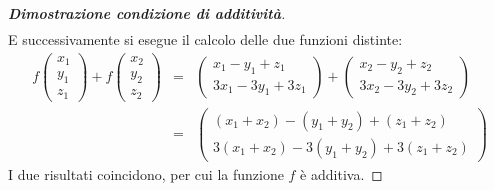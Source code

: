 \documentclass[a4paper]{article}
\begin{document}
\begin{proof}[\textbf{Dimostrazione condizione di additività}]
\begin{equation*}
\begin{array}{rll}
			\end{array}
		\end{equation*}
		E successivamente si esegue il calcolo delle due funzioni distinte:
		\begin{equation*}
			\begin{array}{lll}
				f\begin{pmatrix}
					x_{1} \\ y_{1} \\ z_{1}
				\end{pmatrix} +
				f\begin{pmatrix}
					x_{2} \\ y_{2} \\ z_{2}
				\end{pmatrix} &=&
				\begin{pmatrix}
					x_{1} - y_{1} + z_{1} \\ 3x_{1} - 3y_{1} + 3z_{1}
				\end{pmatrix} +
				\begin{pmatrix}
					x_{2} - y_{2} + z_{2} \\ 3x_{2} - 3y_{2} + 3z_{2}
				\end{pmatrix} \\ [1.8em]
				&=&
				\begin{pmatrix}
					\left(x_{1} + x_{2}\right) - \left(y_{1} + y_{2}\right) + \left(z_{1} + z_{2}\right) \\
					3\left(x_{1}+x_{2}\right) - 3\left(y_{1}+y_{2}\right) + 3\left(z_{1}+z_{2}\right)
				\end{pmatrix}
			\end{array}
		\end{equation*}
		I due risultati coincidono, per cui la funzione $f$ è additiva.
	\end{proof}\newpage
	
\end{document}
